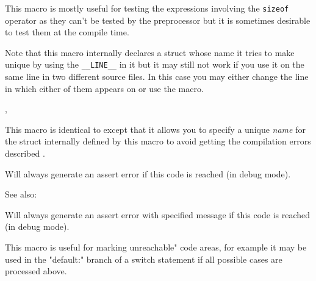 This macro is mostly useful for testing the expressions involving the 
{\tt sizeof} operator as they can't be tested by the preprocessor but it is
sometimes desirable to test them at the compile time.

Note that this macro internally declares a struct whose name it tries to make
unique by using the {\tt \_\_LINE\_\_} in it but it may still not work if you
use it on the same line in two different source files. In this case you may
either change the line in which either of them appears on or use the 
 macro.


,\\

\label{wxcompiletimeassert2}


This macro is identical to  
except that it allows you to specify a unique {\it name} for the struct
internally defined by this macro to avoid getting the compilation errors
described .

\label{wxfail}


Will always generate an assert error if this code is reached (in debug mode).

See also: 

\label{wxfailmsg}


Will always generate an assert error with specified message if this code is reached (in debug mode).

This macro is useful for marking unreachable" code areas, for example
it may be used in the "default:" branch of a switch statement if all possible
cases are processed above.



\label{wxcheck}


